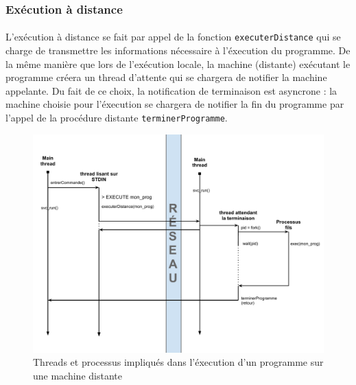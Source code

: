   \subsubsection{Exécution à distance}
    \paragraph{}
    L'exécution à distance se fait par appel de la fonction 
    \verb"executerDistance" qui se charge de transmettre les informations
    nécessaire à l'éxecution du programme. De la même manière que lors
    de l'exécution locale, la machine (distante) exécutant le programme 
    créera un thread d'attente qui se chargera de notifier la machine 
    appelante. Du fait de ce choix, la notification de terminaison est 
    asyncrone : la machine choisie pour l'éxecution se chargera de 
    notifier la fin du programme par l'appel de la procédure distante 
    \verb"terminerProgramme".
    
    
    
    
    
    
    \newpage
    
    \begin{figure}[h!]
      \centering
      \includegraphics[scale=0.6]{img/execution_distante.pdf}
      \caption{Threads et processus impliqués dans l'éxecution d'un 
               programme sur une machine distante}
    \end{figure}

